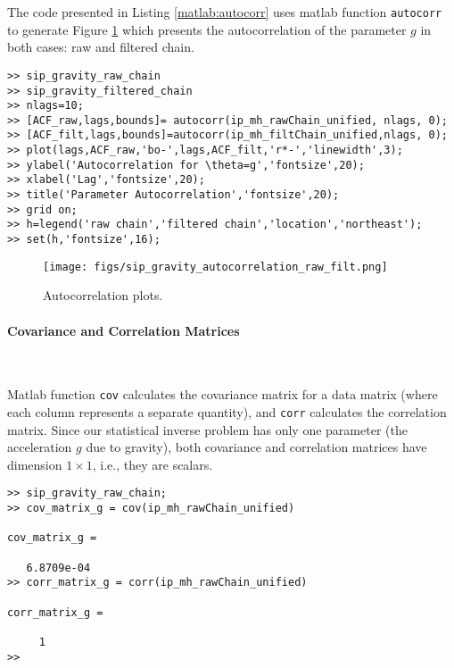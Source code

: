 The code presented in Listing \ref{matlab:autocorr} uses matlab function \verb+autocorr+ to generate 
Figure \ref{fig:sip_gravity_autocorrelation_raw_filt}
which presents the autocorrelation of the parameter $g$ in both cases: raw and filtered chain.

\begin{lstlisting}[label=matlab:autocorr,caption={Matlab code for the autocorrelation plots.}]
% inside Matlab
>> sip_gravity_raw_chain
>> sip_gravity_filtered_chain
>> nlags=10;
>> [ACF_raw,lags,bounds]= autocorr(ip_mh_rawChain_unified, nlags, 0);
>> [ACF_filt,lags,bounds]=autocorr(ip_mh_filtChain_unified,nlags, 0);
>> plot(lags,ACF_raw,'bo-',lags,ACF_filt,'r*-','linewidth',3);
>> ylabel('Autocorrelation for \theta=g','fontsize',20);
>> xlabel('Lag','fontsize',20);
>> title('Parameter Autocorrelation','fontsize',20);
>> grid on;
>> h=legend('raw chain','filtered chain','location','northeast');
>> set(h,'fontsize',16);
\end{lstlisting}

\begin{figure}[p]
\centering
\texttt{[image: figs/sip\_gravity\_autocorrelation\_raw\_filt.png]}
\vspace{-8pt}
\caption{
Autocorrelation plots. }
\label{fig:sip_gravity_autocorrelation_raw_filt}
\end{figure}

\paragraph{Covariance and Correlation Matrices}\

Matlab function \verb+cov+ calculates the covariance matrix for a data matrix 
(where each column represents a separate quantity), and \verb+corr+ calculates the correlation matrix.
Since our statistical inverse problem has only one parameter (the acceleration $g$ due to gravity), 
both covariance and correlation matrices have dimension $1 \times 1$, i.e., they are scalars.

\begin{lstlisting}[label=matlab:cov_matrix,caption={Matlab code for finding the covariance matrix.}]
% inside Matlab
>> sip_gravity_raw_chain;
>> cov_matrix_g = cov(ip_mh_rawChain_unified)
   
cov_matrix_g =

   6.8709e-04
>> corr_matrix_g = corr(ip_mh_rawChain_unified)

corr_matrix_g =

     1
>>
\end{lstlisting}

